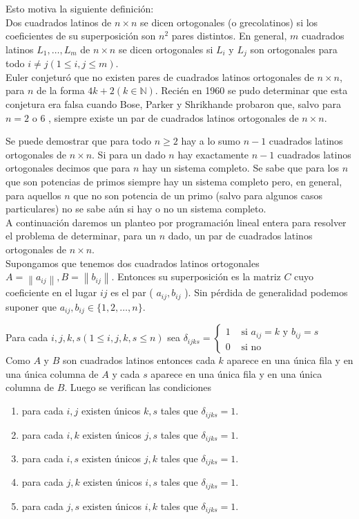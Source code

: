 \documentclass[10pt]{article}
\begin{document}
Esto motiva la siguiente definición:\\
Dos cuadrados latinos de $n \times n$ se dicen ortogonales (o grecolatinos) si los coeficientes de su superposición son $n^{2}$ pares distintos. En general, $m$ cuadrados latinos $L_{1}, \ldots, L_{m}$ de $n \times n$ se dicen ortogonales si $L_{i}$ y $L_{j}$ son ortogonales para todo $i \neq j(1 \leq i, j \leq m)$.\\
Euler conjeturó que no existen pares de cuadrados latinos ortogonales de $n \times n$, para $n$ de la forma $4 k+2 (k \in \mathbb{N})$. Recién en 1960 se pudo determinar que esta conjetura era falsa cuando Bose, Parker y Shrikhande probaron que, salvo para $n=2$ o 6 , siempre existe un par de cuadrados latinos ortogonales de $n \times n$.

Se puede demostrar que para todo $n \geq 2$ hay a lo sumo $n-1$ cuadrados latinos ortogonales de $n \times n$. Si para un dado $n$ hay exactamente $n-1$ cuadrados latinos ortogonales decimos que para $n$ hay un sistema completo. Se sabe que para los $n$ que son potencias de primos siempre hay un sistema completo pero, en general, para aquellos $n$ que no son potencia de un primo (salvo para algunos casos particulares) no se sabe aún si hay o no un sistema completo.\\
A continuación daremos un planteo por programación lineal entera para resolver el problema de determinar, para un $n$ dado, un par de cuadrados latinos ortogonales de $n \times n$.\\
Supongamos que tenemos dos cuadrados latinos ortogonales $A=\left\|a_{i j}\right\|, B=\left\|b_{i j}\right\|$. Entonces su superposición es la matriz $C$ cuyo coeficiente en el lugar $i j$ es el par ( $a_{i j}, b_{i j}$ ). Sin pérdida de generalidad podemos suponer que $a_{i j}, b_{i j} \in\{1,2, \ldots, n\}$.

Para cada $i, j, k, s(1 \leq i, j, k, s \leq n)$ sea $\delta_{i j k s}= \begin{cases}1 & \text { si } a_{i j}=k \text { y } b_{i j}=s \\ 0 & \text { si no }\end{cases}$\\
Como $A$ y $B$ son cuadrados latinos entonces cada $k$ aparece en una única fila y en una única columna de $A$ y cada $s$ aparece en una única fila y en una única columna de $B$. Luego se verifican las condiciones

\begin{enumerate}
  \item para cada $i, j$ existen únicos $k, s$ tales que $\delta_{i j k s}=1$.
  \item para cada $i, k$ existen únicos $j, s$ tales que $\delta_{i j k s}=1$.
  \item para cada $i, s$ existen únicos $j, k$ tales que $\delta_{i j k s}=1$.
  \item para cada $j, k$ existen únicos $i, s$ tales que $\delta_{i j k s}=1$.
  \item para cada $j, s$ existen únicos $i, k$ tales que $\delta_{i j k s}=1$.
\end{enumerate}
\end{document}
